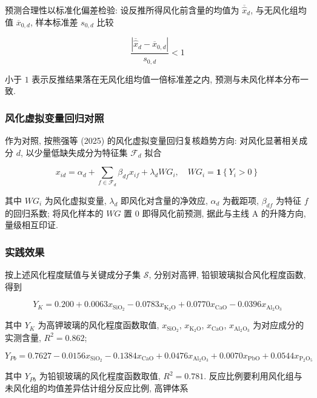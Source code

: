 \documentclass{ctexart}
\begin{document}
预测合理性以标准化偏差检验: 设反推所得风化前含量的均值为 $\overline{\widehat{x}}_{d}$, 与无风化组均值 $\overline{x}_{0,d}$, 样本标准差 $s_{0,d}$ 比较

\begin{equation*}
\frac{\left|\overline{\widehat{x}}_{d}-\overline{x}_{0,d}\right|}{s_{0,d}}<1
\end{equation*}

小于 $1$ 表示反推结果落在无风化组均值一倍标准差之内, 预测与未风化样本分布一致.


\subsubsection{风化虚拟变量回归对照}

作为对照, 按熊强等 (2025) 的风化虚拟变量回归复核趋势方向: 对风化显著相关成分 $d$, 以少量低缺失成分为特征集 $\mathcal{F}_d$ 拟合

\begin{equation*}
x_{id}=\alpha_{d}+\sum_{f\in\mathcal{F}_d}\beta_{df}x_{if}+\lambda_{d}WG_i,\quad{}WG_i=\mathbf{1}\left\{Y_i>0\right\}
\end{equation*}

其中 $WG_i$ 为风化虚拟变量, $\lambda_d$ 即风化对含量的净效应, $\alpha_d$ 为截距项, $\beta_{df}$ 为特征 $f$ 的回归系数; 将风化样本的 $WG$ 置 $0$ 即得风化前预测, 据此与主线 A 的升降方向, 量级相互印证.


\subsubsection{实践效果}

按上述风化程度赋值与关键成分子集 $\mathcal{S}$, 分别对高钾, 铅钡玻璃拟合风化程度函数, 得到

\begin{equation*}
Y_K=0.200+0.0063x_{\mathrm{SiO_2}}-0.0783x_{\mathrm{K_2O}}+0.0770x_{\mathrm{CaO}}-0.0396x_{\mathrm{Al_2O_3}}
\end{equation*}

其中 $Y_K$ 为高钾玻璃的风化程度函数取值, $x_{\mathrm{SiO_2}}$, $x_{\mathrm{K_2O}}$, $x_{\mathrm{CaO}}$, $x_{\mathrm{Al_2O_3}}$ 为对应成分的实测含量, $R^2=0.862$;

\begin{equation*}
Y_{Pb}=0.7627-0.0156x_{\mathrm{SiO_2}}-0.1384x_{\mathrm{CaO}}+0.0476x_{\mathrm{Al_2O_3}}+0.0070x_{\mathrm{PbO}}+0.0544x_{\mathrm{P_2O_5}}
\end{equation*}

其中 $Y_{Pb}$ 为铅钡玻璃的风化程度函数取值, $R^2=0.781$. 反应比例要利用风化组与未风化组的均值差异估计组分反应比例, 高钾体系
\end{document}
